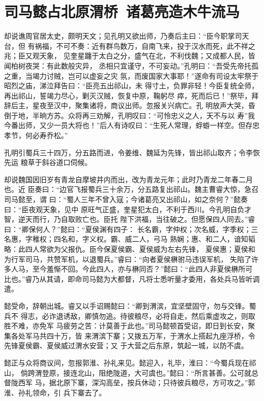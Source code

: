 \chapter{司马懿占北原渭桥~诸葛亮造木牛流马}

却说谯周官居太史，颇明天文；见孔明又欲出师，乃奏后主曰：“臣今职掌司天台，但
有祸福，不可不奏：近有群鸟数万，自南飞来，投于汉水而死，此不祥之兆；臣又观天象，
见奎星躔于太白之分，盛气在北，不利伐魏；又成都人民，皆闻柏树夜哭：有此数般灾异，
丞相只宜谨守，不可妄动。”孔明曰：“吾受先帝托孤之重，当竭力讨贼，岂可以虚妄之灾
氛，而废国家大事耶！”遂命有司设太牢祭于昭烈之庙，涕泣拜告曰：“臣亮五出祁山，未
得寸土，负罪非轻！今臣复统全师，再出祁山，誓竭力尽心，剿灭汉贼，恢复中原，鞠躬尽
瘁，死而后已！”祭毕，拜辞后主，星夜至汉中，聚集诸将，商议出师。忽报关兴病亡。孔
明放声大哭，昏倒于地，半晌方苏。众将再三劝解，孔明叹曰：“可怜忠义之人，天不与以
寿”我今番出师，又少一员大将也！”后人有诗叹曰：“生死人常理，蜉蝣一样空。但存忠
孝节，何必寿乔松。”

孔明引蜀兵三十四万，分五路而进，令姜维、魏延为先锋，皆出祁山取齐；令李恢先运
粮草于斜谷道口伺候。

却说魏国因旧岁有青龙自摩坡井内而出，改为青龙元年；此时乃青龙二年春二月也。近
臣奏曰：“边官飞报蜀兵三十余万，分五路复出祁山。魏主曹睿大惊，急召司马懿至，谓
曰：“蜀人三年不曾入寇；今诸葛亮又出祁山，如之奈何？”懿奏曰：“臣夜观天象，见中
原旺气正盛，奎星犯太白，不利于西川。今孔明自负才智，逆天而行，乃自取败亡也。臣托
陛下洪福，当往破之。但愿保四人同去。”睿曰：“卿保何人？”懿曰：“夏侯渊有四子：
长名霸，字仲权；次名威，字季权；三名惠，字稚权；四名和，字义权。霸、威二人，弓马
熟娴；惠、和二人，谙知韬略：此四人常欲为父报仇。臣今保夏侯霸、夏侯威为左右先锋，
夏侯惠；夏侯和为行军司马，共赞军机，以退蜀兵。”睿曰：“向者夏侯楙驸马违误军机，
失陷了许多人马，至今羞惭不回。今此四人，亦与楙同否？”懿曰：“此四人非夏侯楙所可
比也。”睿乃从其请，即命司马懿为大都督，凡将士悉听量才委用，各处兵马皆听调遣。

懿受命，辞朝出城。睿又以手诏赐懿曰：“卿到渭滨，宜坚壁固守，勿与交锋。蜀兵不
得志，必诈退诱敌，卿慎勿追。待彼粮尽，必将自走，然后乘虚攻之，则取胜不难，亦免军
马疲劳之苦：计莫善于此也。”司马懿顿首受诏，即日到长安，聚集各处军马共四十万，皆
来渭滨下寨；又拨五万军，于渭水上搭起九座浮桥，令先锋夏侯霸、夏侯威过渭水安营；又
于大营之后东原，筑起一城，以防不虞。

懿正与众将商议间，忽报郭淮、孙礼来见。懿迎入，礼毕，淮曰：“今蜀兵现在祁山，
倘跨渭登原，接连北山，阻绝陇道，大可虞也。”懿曰：“所言甚善。公可就总督陇西军
马，据北原下寨，深沟高垒，按兵休动；只待彼兵粮尽，方可攻之。”郭淮、孙礼领命，引
兵下寨去了。

